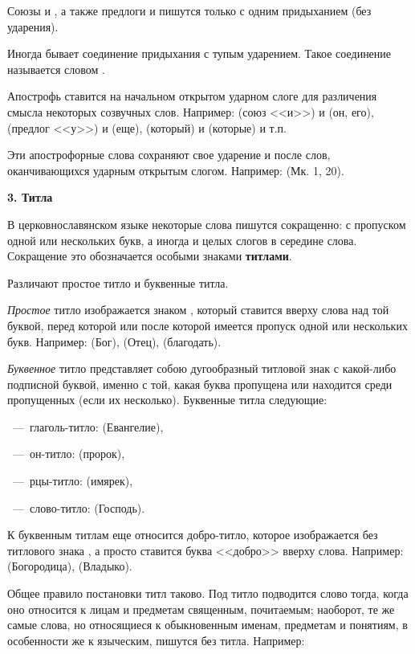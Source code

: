 \documentclass[11pt,a4paper,oneside]{memoir}
\begin{document}
    Союзы {} и {}, а также предлоги {} и {} пишутся только с одним придыханием (без ударения).
    
    Иногда бывает соединение придыхания с тупым ударением. Такое соединение называется словом {}.
    
    Апострофь ставится на начальном открытом ударном слоге для различения смысла некоторых созвучных слов. Например: {} (союз <<и>>) и {} (он, его), {} (предлог <<у>>) и {} (еще), {} (который) и {} (которые) и т.п.

    Эти апострофорные слова сохраняют свое ударение и после слов, оканчивающихся ударным открытым слогом. Например: {} (Мк. 1, 20).
    
    \medskip
    \textbf{3. Титла}
    \medskip
    
    В церковнославянском языке некоторые слова пишутся сокращенно: с пропуском одной или нескольких букв, а иногда и целых слогов в середине слова. Сокращение это обозначается особыми знаками \textbf{титлами}.
    
    Различают простое титло и буквенные титла.
    
    \emph{Простое} титло изображается знаком {}, который ставится вверху слова над той буквой, перед которой или после которой имеется пропуск одной или нескольких букв. Например: {} (Бог), {} (Отец), {} (благодать).
    
    \emph{Буквенное} титло представляет собою дугообразный титловой знак {} с какой-либо подписной буквой, именно с той, какая буква пропущена или находится среди пропущенных (если их несколько). Буквенные титла следующие:
    \medskip
    
    {}~---~глаголь-титло: {} (Евангелие),

    {}~---~он-титло: {} (пророк),

    {}~---~рцы-титло: {} (имярек),

    {}~---~слово-титло: {} (Господь).
    \medskip
    
    К буквенным титлам еще относится добро-титло, которое изображается без титлового знака {}, а просто ставится буква <<добро>> вверху слова. Например: {} (Богородица), {} (Владыко).
    
    Общее правило постановки титл таково. Под титло подводится слово тогда, когда оно относится к лицам и предметам священным, почитаемым; наоборот, те же самые слова, но относящиеся к обыкновенным именам, предметам и понятиям, в особенности же к языческим, пишутся без титла. Например:
    \medskip
    
\end{document}
